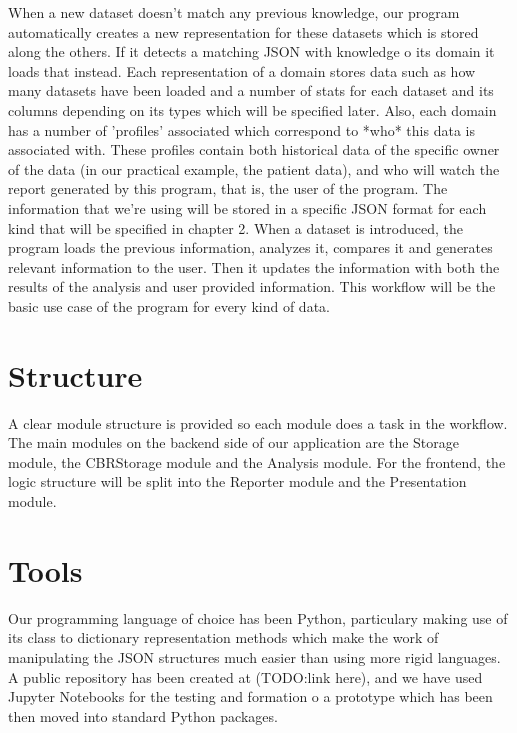 When a new dataset doesn't match any previous knowledge, our program automatically creates a new representation for these datasets which is stored along the others. If it detects a matching JSON with knowledge o its domain it loads that instead.
Each representation of a domain stores data such as how many datasets have been loaded and a number of stats for each dataset and its columns depending on its types which will be specified later.
Also, each domain has a number of 'profiles' associated which correspond to *who* this data is associated with. These profiles contain both historical data of the specific owner of the data (in our practical example, the patient data), and who will watch the report generated by this program, that is, the user of the program.
The information that we're using will be stored in a specific JSON format for each kind that will be specified in chapter 2.
When a dataset is introduced, the program loads the previous information, analyzes it, compares it and generates relevant information to the user. Then it updates the information with both the results of the analysis and user provided information.
This workflow will be the basic use case of the program for every kind of data.

\section{Structure}
\label{cap1:sec:structure}
A clear module structure is provided so each module does a task in the workflow.
The main modules on the backend side of our application are the Storage module, the CBRStorage module and the Analysis module.
For the frontend, the logic structure will be split into the Reporter module and the Presentation module.

\section{Tools}
\label{cap1:sec:tools}

Our programming language of choice has been Python, particulary making use of its class to dictionary representation methods which make the work of manipulating the JSON structures much easier than using more rigid languages.
A public repository has been created at (TODO:link here), and we have used Jupyter Notebooks for the testing and formation o a prototype which has been then moved into standard Python packages.

